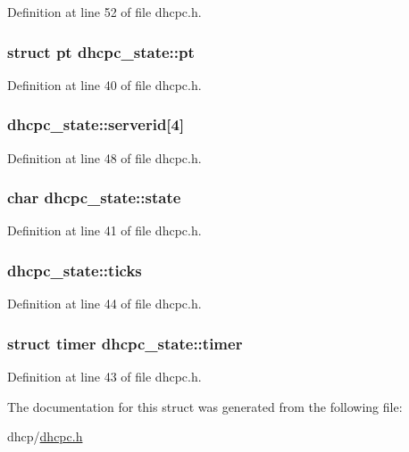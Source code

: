 Definition at line 52 of file dhcpc.h.

\hypertarget{structdhcpc__state_a31471b5e27bda51832d0fa49bd6d9b54}{
\subsubsection[{pt}]{\setlength{\rightskip}{0pt plus 5cm}struct {\bf pt} {\bf dhcpc\_\-state::pt}}}
\label{structdhcpc__state_a31471b5e27bda51832d0fa49bd6d9b54}


Definition at line 40 of file dhcpc.h.

\hypertarget{structdhcpc__state_a564bab93ef6a268a5de2fab885c1d32a}{
\subsubsection[{serverid}]{ {\bf dhcpc\_\-state::serverid}\mbox{[}4\mbox{]}}}
\label{structdhcpc__state_a564bab93ef6a268a5de2fab885c1d32a}


Definition at line 48 of file dhcpc.h.

\hypertarget{structdhcpc__state_ae0b137a3875ad12a99e5e3e0e177fd12}{
\subsubsection[{state}]{\setlength{\rightskip}{0pt plus 5cm}char {\bf dhcpc\_\-state::state}}}
\label{structdhcpc__state_ae0b137a3875ad12a99e5e3e0e177fd12}


Definition at line 41 of file dhcpc.h.

\hypertarget{structdhcpc__state_ae707c39412e09d3a47f0b3c5dad33725}{
\subsubsection[{ticks}]{ {\bf dhcpc\_\-state::ticks}}}
\label{structdhcpc__state_ae707c39412e09d3a47f0b3c5dad33725}


Definition at line 44 of file dhcpc.h.

\hypertarget{structdhcpc__state_ae80af46ceef63eab3c786525370ae720}{
\subsubsection[{timer}]{\setlength{\rightskip}{0pt plus 5cm}struct {\bf timer} {\bf dhcpc\_\-state::timer}}}
\label{structdhcpc__state_ae80af46ceef63eab3c786525370ae720}


Definition at line 43 of file dhcpc.h.



The documentation for this struct was generated from the following file:\begin{DoxyCompactItemize}
\item 
dhcp/\hyperlink{dhcpc_8h}{dhcpc.h}\end{DoxyCompactItemize}
